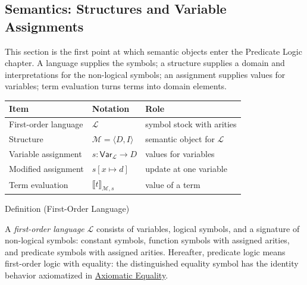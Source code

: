 
\subsection{Semantics: Structures and Variable Assignments}

\begin{remark*}
This section is the first point at which semantic objects enter the Predicate
Logic chapter. A language supplies the symbols; a structure supplies a domain
and interpretations for the non-logical symbols; an assignment supplies values
for variables; term evaluation turns terms into domain elements.

\begin{center}
\small
\begin{tabular}{l l l}
\toprule
\textbf{Item} & \textbf{Notation} & \textbf{Role} \\
\midrule
First-order language & \(\mathcal L\) & symbol stock with arities \\
Structure & \(\mathcal M=\langle D,I\rangle\) & semantic object for \(\mathcal L\) \\
Variable assignment & \(s:\mathsf{Var}_{\mathcal L}\to D\) & values for variables \\
Modified assignment & \(s[x\mapsto d]\) & update at one variable \\
Term evaluation & \(\llbracket t\rrbracket_{\mathcal M,s}\) & value of a term \\
\bottomrule
\end{tabular}
\end{center}
\end{remark*}

\begin{definitionbox}{Definition (First-Order Language)}
\begin{definition}
\label{def:fo-language}
A \emph{first-order language} \(\mathcal L\) consists of variables, logical
symbols, and a signature of non-logical symbols: constant symbols, function
symbols with assigned arities, and predicate symbols with assigned arities.
Hereafter, predicate logic means first-order logic with equality: the
distinguished equality symbol has the identity behavior axiomatized in
\hyperref[ch:axiomatic-equality]{Axiomatic Equality}.
\end{definition}
\end{definitionbox}

